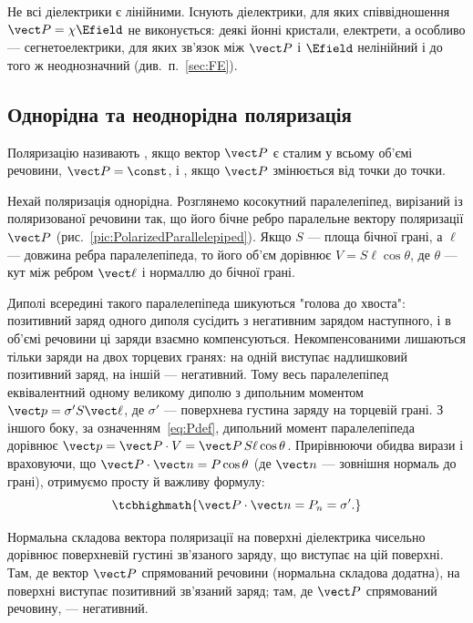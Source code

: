 \begin{Attention}
	Не всі діелектрики є лінійними. Існують діелектрики, для яких співвідношення $\vect P = \chi\Efield$ не виконується: деякі йонні кристали,
	електрети, а особливо --- сегнетоелектрики, для яких зв'язок між $\vect P$ і $\Efield$ нелінійний і до того ж неоднозначний (див.~п.~\ref{sec:FE}).
\end{Attention}

\subsection*{Однорідна та неоднорідна поляризація}

Поляризацію називають , якщо вектор $\vect P$ є сталим у всьому об'ємі речовини, $\vect P = \const$, і , якщо
$\vect P$ змінюється від точки до точки.

 Нехай поляризація однорідна. Розглянемо косокутний паралелепіпед, вирізаний із поляризованої речовини так, що його
бічне ребро паралельне вектору поляризації $\vect P$ (рис.~\ref{pic:PolarizedParallelepiped}). Якщо $S$ --- площа бічної грані, а $\ell$ --- довжина
ребра паралелепіпеда, то його об'єм дорівнює $V = S\ell\cos\theta$, де $\theta$ --- кут між ребром $\vect \ell$ і нормаллю до бічної грані.

Диполі всередині такого паралелепіпеда шикуються "голова до хвоста": позитивний заряд одного диполя сусідить з негативним зарядом наступного, і в
об'ємі речовини ці заряди взаємно компенсуються. Некомпенсованими лишаються тільки заряди на двох торцевих гранях: на одній виступає надлишковий
позитивний заряд, на іншій --- негативний. Тому весь паралелепіпед еквівалентний одному великому диполю з дипольним моментом $\vect p = \sigma' S
	\vect \ell$, де $\sigma'$ --- поверхнева густина  заряду на торцевій грані. З іншого боку, за
означенням~\eqref{eq:Pdef}, дипольний момент паралелепіпеда дорівнює $\vect p = \vect P \cdot V = \vect P \, S\ell\cos\theta$. Прирівнюючи обидва
вирази і враховуючи, що $\vect P \cdot \vect n = P\cos\theta$ (де $\vect n$ --- зовнішня нормаль до грані), отримуємо просту й важливу формулу:
\begin{equation}\label{eq:SigmaPrime}
	\tcbhighmath{
		\vect P \cdot \vect n = P_n = \sigma'.
	}
\end{equation}

\begin{Attention}
	Нормальна складова вектора поляризації на поверхні діелектрика чисельно дорівнює поверхневій густині зв'язаного заряду, що виступає на цій
	поверхні. Там, де вектор $\vect P$ спрямований  речовини (нормальна складова додатна), на поверхні виступає позитивний зв'язаний
	заряд; там, де $\vect P$ спрямований  речовину, --- негативний.
\end{Attention}


